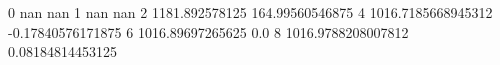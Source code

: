 0 nan nan
1 nan nan
2 1181.892578125 164.99560546875
4 1016.7185668945312 -0.17840576171875
6 1016.89697265625 0.0
8 1016.9788208007812 0.08184814453125
